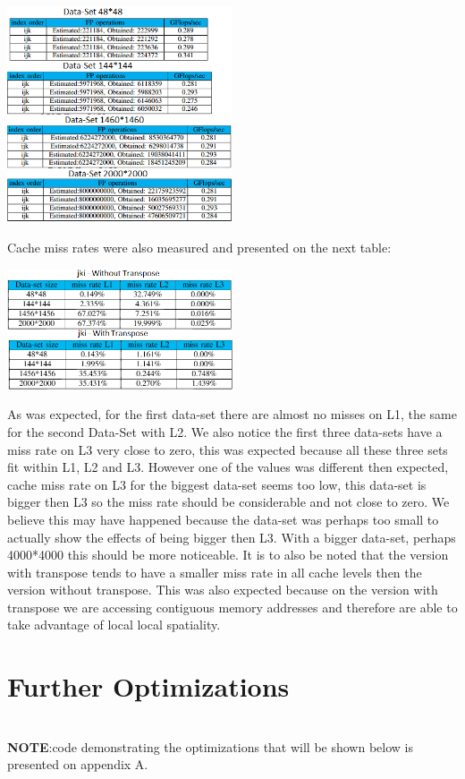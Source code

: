 \documentclass[journal]{IEEEtran}
\begin{document}
\includegraphics[width=0.50\textwidth, left]{flop.png}

Cache miss rates were also measured and presented on the next table:

\includegraphics[width=0.50\textwidth, left]{cache.png}

As was expected, for the first data-set there are almost no misses on L1, the same for the second Data-Set with L2. We also notice the first three data-sets have a miss rate on L3 very close to zero, this was expected because all these three sets fit within L1, L2 and L3. However one of the values was different then expected, cache miss rate on L3 for the biggest data-set seems too low, this data-set is bigger then L3 so the miss rate should be considerable and not close to zero. We believe this may have happened because the data-set was perhaps too small to actually show the effects of being bigger then L3. With a bigger data-set, perhaps 4000*4000 this should be more noticeable. It is to also be noted that the version with transpose tends to have a smaller miss rate in all cache levels then the version without transpose. This was also expected because on the version with transpose we are accessing contiguous memory addresses and therefore are able to take advantage of local local spatiality.

\section{Further Optimizations}
\\
\textbf{NOTE}:code demonstrating the optimizations that will be shown below is presented on appendix A.
\\
\end{document}
